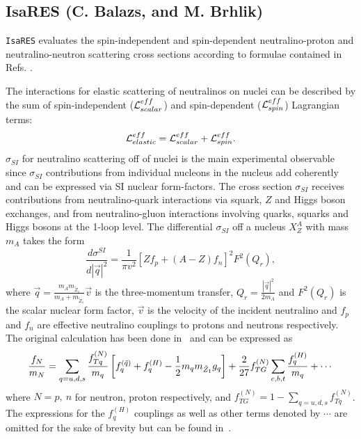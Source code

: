 \subsection{IsaRES (C. Balazs,  and M. Brhlik)} 

\verb|IsaRES| evaluates the spin-independent and spin-dependent
neutralino-proton and neutralino-neutron scattering cross sections
according to formulae contained in Refs. \cite{bb2,bbbo}.


The interactions for elastic scattering of neutralinos on nuclei can be
described by the sum of spin-independent (${\cal L}^{eff}_{scalar}$) and 
spin-dependent (${\cal L}^{eff}_{spin}$) Lagrangian terms:
\begin{equation}
 {\cal L}^{eff}_{elastic}={\cal L}^{eff}_{scalar}+{\cal L}^{eff}_{spin} .
\end{equation}
$\sigma_{SI}$ for 
neutralino scattering off of nuclei  is the main experimental observable 
since $\sigma_{SI}$ contributions from individual nucleons in the nucleus add 
coherently and can be expressed via SI nuclear form-factors. The cross section 
$\sigma_{SI}$ receives contributions from neutralino-quark interactions via 
squark, $Z$ and Higgs boson exchanges, and from neutralino-gluon interactions 
involving quarks, squarks and Higgs bosons at the 1-loop level. The differential 
$\sigma_{SI}$ off a nucleus $X_Z^A$ with mass $m_A$ takes the 
form~\cite{kam_review}
\begin{equation}
 \frac{d\sigma^{SI}}{d|\vec{q}|^2}=\frac{1}{\pi v^2}[Z f_p +(A-Z) f_n]^2 
 F^2 (Q_r),
\end{equation}                                 
where $\vec{q}=\frac{m_A m_{\widetilde Z_1}}{m_A+m_{\widetilde Z_1}}\vec{v}$ is 
the three-momentum transfer, $Q_r=\frac{|\vec{q}|^2}{2m_A}$ and $F^2(Q_r)$ is 
the scalar nuclear form factor, $\vec{v}$ is the velocity of the incident 
neutralino and $f_p$ and $f_n$ are effective neutralino couplings to protons and 
neutrons respectively.
The original calculation has been done in~\cite{drees-nojiri} and can 
be expressed as
\begin{equation}
{f_N \over m_N} = \sum_{q=u,d,s} \frac{f_{Tq}^{(N)}}{m_q} \left[
f_q^{(\tilde q )}+f_q^{(H)}-{1\over 2}m_q m_{\tilde Z_1}g_q\right]  + 
\frac{2}{27} f^{(N)}_{TG} \sum_{c,b,t} \frac{f_q^{(H)}}{m_q} +\cdots
\end{equation}
%
where $N=p,\ n$ for neutron, proton respectively, and
$f^{(N)}_{TG} = 1 - \sum_{q=u,d,s} f^{(N)}_{Tq} $.
The expressions for the $f_q^{(H)}$ couplings as well as other terms
denoted by $\cdots$ are omitted for the sake of brevity but can be found 
in~\cite{drees-nojiri,baer-brhlik}.

